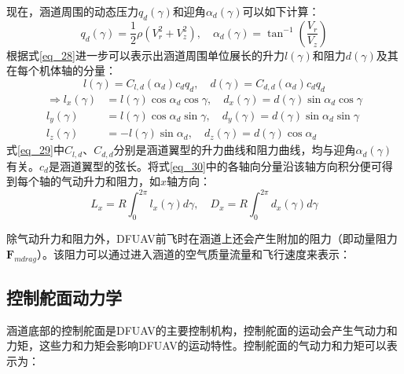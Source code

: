 现在，涵道周围的动态压力$q_d(\gamma)$和迎角$\alpha_d(\gamma)$可以如下计算：
\begin{equation}
        q_d(\gamma)=\frac{1}{2}\rho\left(V_r^2+V_z^2\right) ,\quad
        \alpha_d(\gamma)=\tan^{-1}\left(\frac{V_r}{V_z}\right)
    \label{eq_28}
\end{equation}
根据式\eqref{eq_28}进一步可以表示出涵道周围单位展长的升力$l(\gamma)$和阻力$d(\gamma)$及其在每个机体轴的分量：
\begin{equation}
        l(\gamma)=C_{l,d}(\alpha_d)c_dq_d, \quad
        d(\gamma)=C_{d,d}(\alpha_d)c_dq_d
    \label{eq_29}
\end{equation}
\begin{equation}
        \begin{aligned}
            \Rightarrow
        l_{x}(\gamma)&=l(\gamma)\cos\alpha_d\cos\gamma,\quad d_x(\gamma)=d(\gamma)\sin\alpha_d\cos\gamma \\
        l_{y}(\gamma)&=l(\gamma)\cos\alpha_d\sin\gamma,\quad d_y(\gamma)=d(\gamma)\sin\alpha_d\sin\gamma \\
        l_{z}(\gamma)&=-l(\gamma)\sin\alpha_d,\quad d_z(\gamma)=d(\gamma)\cos\alpha_d
        \label{eq_30}
    \end{aligned}
\end{equation}
式\eqref{eq_29}中$C_{l,d}$、$C_{d,d}$分别是涵道翼型的升力曲线和阻力曲线，均与迎角$\alpha_d(\gamma)$有关。$c_d$是涵道翼型的弦长。将式\eqref{eq_30}中的各轴向分量沿该轴方向积分便可得到每个轴的气动升力和阻力，如$x$轴方向：
\begin{equation}
    L_x=R\int_0^{2\pi}l_x(\gamma)d\gamma, \quad
    D_x=R\int_0^{2\pi}d_x(\gamma)d\gamma
    \label{eq_31}
\end{equation}

除气动升力和阻力外，DFUAV前飞时在涵道上还会产生附加的阻力（即动量阻力$\boldsymbol{F}_{mdrag}$\cite{choiStaticAnalysisSmall2012}）。该阻力可以通过进入涵道的空气质量流量和飞行速度来表示：




\subsection{控制舵面动力学}

涵道底部的控制舵面是DFUAV的主要控制机构，控制舵面的运动会产生气动力和力矩，这些力和力矩会影响DFUAV的运动特性。控制舵面的气动力和力矩可以表示为\cite{johnsonModelingControlFlight2006b,choiStaticAnalysisSmall2012}：







